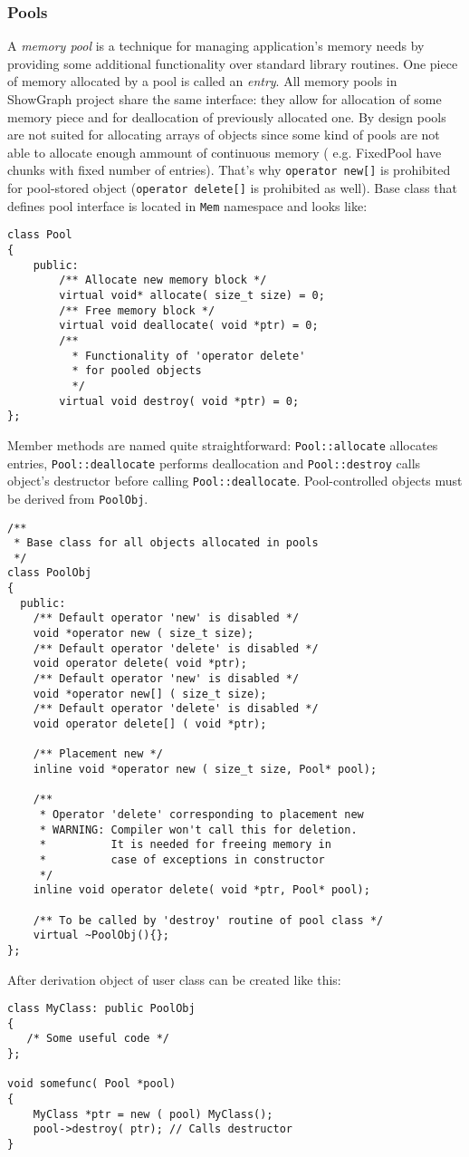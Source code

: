 \documentclass[11pt,a4paper]{article}
\begin{document}
\subsubsection{Pools}
A \emph{memory pool} is a technique for managing application's memory needs by providing some additional functionality over standard library routines. One piece of memory allocated by a pool is called an \emph{entry}. All memory pools in ShowGraph project share the same interface: they allow for allocation of some memory piece and for deallocation of previously allocated one. By design pools are not suited for allocating arrays of objects since some kind of pools are not able to allocate enough ammount of continuous memory ( e.g. FixedPool have chunks with fixed number of entries). That's why \lstinline{operator new[]} is prohibited for pool-stored object (\lstinline{operator delete[]} is prohibited as well). Base class that defines pool interface is located in \lstinline{Mem} namespace and looks like:
\begin{lstlisting}
class Pool
{
    public:
        /** Allocate new memory block */
        virtual void* allocate( size_t size) = 0;
        /** Free memory block */
        virtual void deallocate( void *ptr) = 0;
        /** 
          * Functionality of 'operator delete'
          * for pooled objects
          */
        virtual void destroy( void *ptr) = 0;
};
\end{lstlisting}
Member methods are named quite straightforward: \lstinline{Pool::allocate} allocates entries, \lstinline{Pool::deallocate} performs deallocation and  \lstinline{Pool::destroy} calls object's destructor before calling  \lstinline{Pool::deallocate}. Pool-controlled objects must be derived from  \lstinline{PoolObj}.
\begin{lstlisting}
/**
 * Base class for all objects allocated in pools
 */    
class PoolObj
{
  public:
    /** Default operator 'new' is disabled */
    void *operator new ( size_t size);
    /** Default operator 'delete' is disabled */
    void operator delete( void *ptr);
    /** Default operator 'new' is disabled */
    void *operator new[] ( size_t size);
    /** Default operator 'delete' is disabled */
    void operator delete[] ( void *ptr);
       
    /** Placement new */
    inline void *operator new ( size_t size, Pool* pool);
    
    /**
     * Operator 'delete' corresponding to placement new
     * WARNING: Compiler won't call this for deletion. 
     *          It is needed for freeing memory in  
     *          case of exceptions in constructor
     */
    inline void operator delete( void *ptr, Pool* pool);
    
    /** To be called by 'destroy' routine of pool class */
    virtual ~PoolObj(){};
};
\end{lstlisting}
After derivation object of user class can be created like this:
\begin{lstlisting}
class MyClass: public PoolObj
{
   /* Some useful code */        
};

void somefunc( Pool *pool)
{
    MyClass *ptr = new ( pool) MyClass();
    pool->destroy( ptr); // Calls destructor
}
\end{lstlisting}
\end{document}

